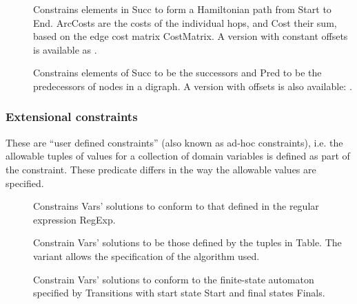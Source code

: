 \begin{description}
\item[]
Constrains elements in Succ to form a Hamiltonian path from Start to End.
ArcCosts are the costs of the individual hops, and Cost their sum,
based on the edge cost matrix CostMatrix.
A version with constant offsets is available as
.

\item[]
Constrains elements of Succ to be the successors and
Pred to be the predecessors of nodes in a digraph. A version with offsets
is also available:
.

\end{description}
 
\subsubsection{Extensional constraints}
These are ``user defined constraints'' (also known as ad-hoc
 constraints), i.e. the allowable tuples of values for a
collection of domain variables is defined as part of the constraint. These
predicate differs in the way the allowable values are specified.

\begin{description}
\item[]
Constrains Vars' solutions to conform to that defined in the regular expression RegExp.

\item[]
Constrain Vars' solutions to be those defined by the tuples in Table.
The variant
allows the specification of the algorithm used.

\item[]
Constrain Vars' solutions to conform to the finite-state 
automaton specified by Transitions with start state Start and  final states Finals.

\end{description}

